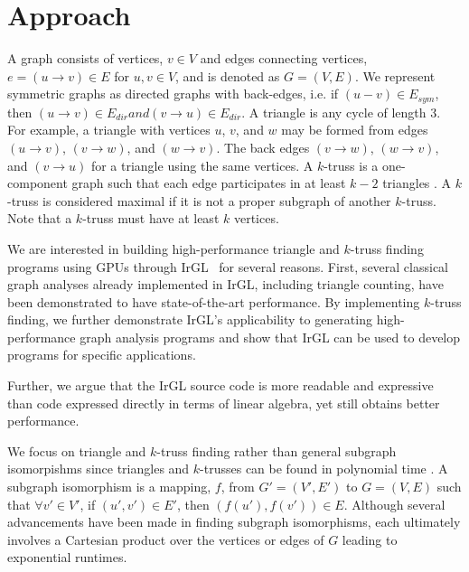 \section{Approach}
A graph consists of vertices, $v \in V$ and edges connecting vertices, $e=(u \rightarrow v) \in E$ for $u, v \in V$, and is denoted as $G=(V,E)$.
We represent symmetric graphs as directed graphs with back-edges, i.e. if $(u-v) \in E_{sym}$, then $(u \rightarrow v) \in E_{dir} and (v \rightarrow u) \in E_{dir}$.
A triangle is any cycle of length 3.
For example, a triangle with vertices $u$, $v$, and $w$ may be formed from edges $(u \rightarrow v)$, $(v \rightarrow w)$, and $(w \rightarrow v)$.
The back edges $(v \rightarrow w)$, $(w \rightarrow v)$, and $(v \rightarrow u)$ for a triangle using the same vertices.
A $k$-truss is a one-component graph such that each edge participates in at least $k-2$ triangles \cite{cohen2008trusses}.
A $k$-truss is considered maximal if it is not a proper subgraph of another $k$-truss. Note that a $k$-truss must have at least $k$ vertices.

We are interested in building high-performance triangle and $k$-truss finding programs using GPUs through IrGL~\cite{pai2016irgl} for several reasons.
First, several classical graph analyses already implemented in IrGL, including triangle counting, have been demonstrated to have state-of-the-art performance.
By implementing $k$-truss finding, we further demonstrate IrGL's applicability to generating high-performance graph analysis programs and show that IrGL can be used to develop programs for specific applications.

Further, we argue that the IrGL source code is more readable and expressive than code expressed directly in terms of linear algebra, yet still obtains better performance.

We focus on triangle and $k$-truss finding rather than general subgraph isomorpishms since triangles and $k$-trusses can be found in polynomial time \cite{shao2014peta}.
A subgraph isomorphism is a mapping, $f$, from $G'=(V',E')$ to $G=(V,E)$ such that $\forall v' \in V'$, if $(u', v') \in E'$, then $(f(u'), f(v')) \in E$.
Although several advancements \cite{sun2012billionnode} \cite{bi2016postonecartesianproducts} \cite{han2013turboiso} have been made in finding subgraph isomorphisms, each ultimately involves a Cartesian product over the vertices or edges of $G$ leading to exponential runtimes.

